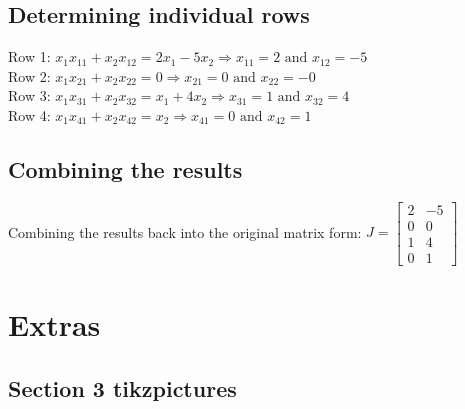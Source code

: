\documentclass{article}
\begin{document}
\subsection{Determining individual rows}
Row 1: $x_1x_{11}+x_2x_{12}=2x_1-5x_2 \Rightarrow x_{11}=2\text{ and }x_{12}=-5$
\\[0.05in]Row 2: $x_1x_{21}+x_2x_{22}=0 \Rightarrow x_{21}=0\text{ and }x_{22}=-0$
\\[0.05in]Row 3: $x_1x_{31}+x_2x_{32}=x_1+4x_2 \Rightarrow x_{31}=1\text{ and }x_{32}=4$
\\[0.05in]Row 4: $x_1x_{41}+x_2x_{42}=x_2 \Rightarrow x_{41}=0\text{ and }x_{42}=1$
\subsection{Combining the results}
Combining the results back into the original matrix form:
$J=\begin{bmatrix}2&-5\\0&0\\1&4\\0&1\end{bmatrix}$
\pagebreak
\section{Extras}
\subsection{Section 3 tikzpictures}
\label{sec:intro}
\end{document}

